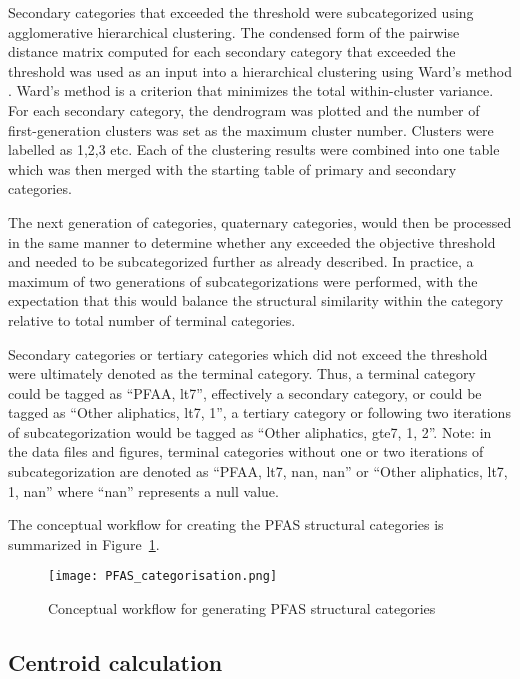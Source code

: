 \documentclass[
  super,
  preprint,
  3p]{elsarticle}
\begin{document}
Secondary categories that exceeded the threshold were subcategorized
using agglomerative hierarchical clustering. The condensed form of the
pairwise distance matrix computed for each secondary category that
exceeded the threshold was used as an input into a hierarchical
clustering using Ward's method \citep{ward_hierarchical_1963}. Ward's
method is a criterion that minimizes the total within-cluster variance.
For each secondary category, the dendrogram was plotted and the number
of first-generation clusters was set as the maximum cluster number.
Clusters were labelled as 1,2,3 etc. Each of the clustering results were
combined into one table which was then merged with the starting table of
primary and secondary categories.

The next generation of categories, quaternary categories, would then be
processed in the same manner to determine whether any exceeded the
objective threshold and needed to be subcategorized further as already
described. In practice, a maximum of two generations of
subcategorizations were performed, with the expectation that this would
balance the structural similarity within the category relative to total
number of terminal categories.

Secondary categories or tertiary categories which did not exceed the
threshold were ultimately denoted as the terminal category. Thus, a
terminal category could be tagged as ``PFAA, lt7'', effectively a
secondary category, or could be tagged as ``Other aliphatics, lt7, 1'',
a tertiary category or following two iterations of subcategorization
would be tagged as ``Other aliphatics, gte7, 1, 2''. Note: in the data
files and figures, terminal categories without one or two iterations of
subcategorization are denoted as ``PFAA, lt7, nan, nan'' or ``Other
aliphatics, lt7, 1, nan'' where ``nan'' represents a null value.

The conceptual workflow for creating the PFAS structural categories is
summarized in Figure~\ref{fig-categorisation}.

\begin{figure}

{\centering \texttt{[image: PFAS\_categorisation.png]}

}

\caption{\label{fig-categorisation}Conceptual workflow for generating
PFAS structural categories}

\end{figure}

\hypertarget{sec-centroid}{%
\subsection{Centroid calculation}\label{sec-centroid}}
\end{document}
